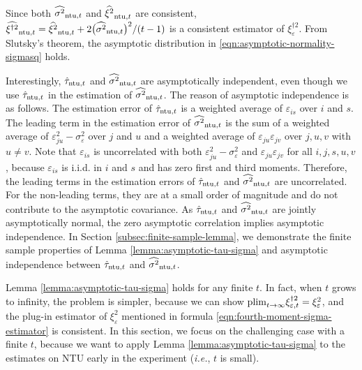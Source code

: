 {Since both $\widehat{\sigma^2}_{\mathrm{ntu},t}$ and $\widehat{\xi^2}_{\mathrm{ntu},t}$ are consistent, $\widehat{\xi^{\dagger 2}}_{\mathrm{ntu},t} = \widehat{\xi^2}_{\mathrm{ntu},t} + 2 \big(\widehat{\sigma^2}_{\mathrm{ntu},t} \big)^2/(t-1)$ is a consistent estimator of $\xi_\varepsilon^{\dagger2}$. From Slutsky's theorem, the asymptotic distribution in \eqref{eqn:asymptotic-normality-sigmasq} holds.


Interestingly, $\hat{\tau}_{\mathrm{ntu},t}$ and $\widehat{\sigma^2}_{\mathrm{ntu},t}$ are asymptotically independent, even though we use $\hat{\tau}_{\mathrm{ntu},t}$ in the estimation of $\widehat{\sigma^2}_{\mathrm{ntu},t}$. The reason of asymptotic independence is as follows. The estimation error of $\hat{\tau}_{\mathrm{ntu},t}$ is a weighted average of $\varepsilon_{is}$ over $i$ and $s$. The leading term in the estimation error of $\widehat{\sigma^2}_{\mathrm{ntu},t} $ is the sum of a weighted average of $\varepsilon^2_{ju} - \sigma_\varepsilon^2$ over $j$ and $u$ and a weighted average of $\varepsilon_{ju} \varepsilon_{jv} $ over $j,u,v$ with $u \neq v$. Note that $\varepsilon_{is}$ is uncorrelated with both $\varepsilon^2_{ju} - \sigma_\varepsilon^2$ and $\varepsilon_{ju} \varepsilon_{jv} $ for all $i,j,s,u,v$, because $\varepsilon_{is}$ is i.i.d. in $i$ and $s$ and has zero first and third moments. Therefore, the leading terms in the estimation errors of $\hat{\tau}_{\mathrm{ntu},t}$ and $\widehat{\sigma^2}_{\mathrm{ntu},t} $ are uncorrelated. For the non-leading terms, they are at a small order of magnitude and do not contribute to the asymptotic covariance. 
As $\hat{\tau}_{\mathrm{ntu},t}$ and $\widehat{\sigma^2}_{\mathrm{ntu},t}$ are jointly asymptotically normal, the zero asymptotic correlation implies asymptotic independence. In Section \ref{subsec:finite-sample-lemma}, we demonstrate the finite sample properties of Lemma \ref{lemma:asymptotic-tau-sigma} and asymptotic independence between $\hat{\tau}_{\mathrm{ntu},t}$ and $\widehat{\sigma^2}_{\mathrm{ntu},t}$.

\begin{remark}\label{remark:lemma-finite-t}
Lemma \ref{lemma:asymptotic-tau-sigma} holds for any finite $t$. In fact, when $t$ grows to infinity, the problem is simpler, because we can show $\mathrm{plim}_{t\rightarrow \infty} \xi^{\dagger 2}_{\varepsilon,t} = \xi^2_\varepsilon$, and the plug-in estimator of $\xi^2_\varepsilon$ mentioned in formula \eqref{eqn:fourth-moment-sigma-estimator} is consistent. In this section, we focus on the challenging case with a finite $t$, because we want to apply Lemma \ref{lemma:asymptotic-tau-sigma} to the estimates on NTU early in the experiment ({\it i.e.}, $t$ is small).
\end{remark}

}

